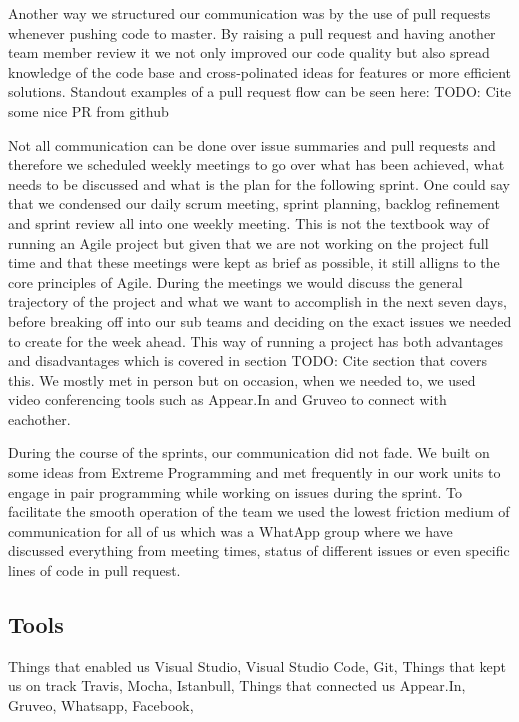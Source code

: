 \documentclass{article}
\begin{document}
	Another way we structured our communication was by the use of pull requests whenever pushing code to master. By raising a pull request and having another team member review it we not only improved our code quality but also spread knowledge of the code base and cross-polinated ideas for features or more efficient solutions. Standout examples of a pull request flow can be seen here: TODO: Cite some nice PR from github
	
	Not all communication can be done over issue summaries and pull requests and therefore we scheduled weekly meetings to go over what has been achieved, what needs to be discussed and what is the plan for the following sprint. One could say that we condensed our daily scrum meeting, sprint planning, backlog refinement and sprint review all into one weekly meeting. This is not the textbook way of running an Agile project but given that we are not working on the project full time and that these meetings were kept as brief as possible, it still alligns to the core principles of Agile. During the meetings we would discuss the general trajectory of the project and what we want to accomplish in the next seven days, before breaking off into our sub teams and deciding on the exact issues we needed to create for the week ahead. This way of running a project has both advantages and disadvantages which is covered in section TODO: Cite section that covers this. We mostly met in person but on occasion, when we needed to, we used video conferencing tools such as Appear.In and Gruveo to connect with eachother.
	
	During the course of the sprints, our communication did not fade. We built on some ideas from Extreme Programming and met frequently in our work units to engage in pair programming while working on issues during the sprint. To facilitate the smooth operation of the team we used the lowest friction medium of communication for all of us which was a WhatApp group where we have discussed everything from meeting times, status of different issues or even specific lines of code in pull request. 
	
	\subsection{Tools}
	
	Things that enabled us
	Visual Studio, Visual Studio Code, Git,
	Things that kept us on track
	Travis, Mocha, Istanbull,
	Things that connected us
	Appear.In, Gruveo, Whatsapp, Facebook,
	
\end{document}
